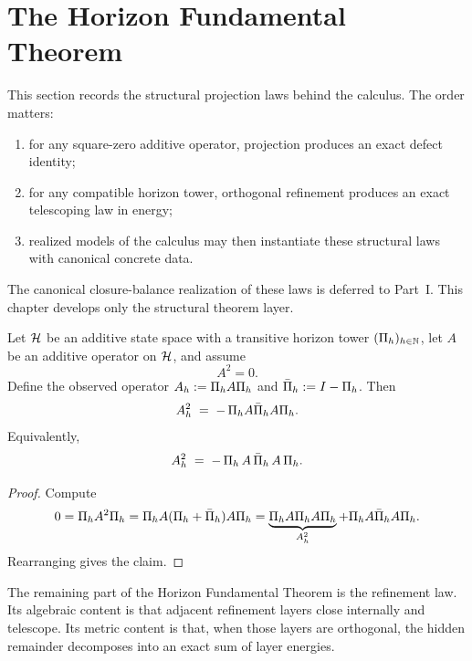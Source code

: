 \section{The Horizon Fundamental Theorem}
\label{sec:hft}

This section records the structural projection laws behind the calculus.
The order matters:

\begin{enumerate}[label=(\roman*)]
\item for any square-zero additive operator, projection produces an exact defect identity;
\item for any compatible horizon tower, orthogonal refinement produces an exact telescoping law in energy;
\item realized models of the calculus may then instantiate these structural laws with canonical concrete data.
\end{enumerate}

The canonical closure-balance realization of these laws is deferred to
Part~I. This chapter develops only the structural theorem layer.

\begin{theorem}
\label{thm:HFT1-general}
Let $\mathcal{H}$ be an additive state space with a transitive horizon tower $(\Pi_{h})_{h\in\mathbb{N}}$, let $A$ be an additive operator on $\mathcal{H}$, and assume
\[
A^2 = 0.
\]
Define the observed operator $A_{h} := \Pi_{h} A \Pi_{h}$ and $\bar{\Pi}_{h} := I - \Pi_{h}$.
Then
\[
A_{h}^2 \;=\; -\,\Pi_{h} A \bar{\Pi}_{h} A \Pi_{h}.
\]
Equivalently,
\[
A_{h}^2 \;=\; -\,\Pi_{h}\, A \,\bar{\Pi}_{h}\, A \,\Pi_{h}.
\]
\end{theorem}

\begin{proof}
Compute
\[
0 = \Pi_{h} A^2 \Pi_{h}
= \Pi_{h} A(\Pi_{h} + \bar{\Pi}_{h})A\Pi_{h}
= \underbrace{\Pi_{h} A\Pi_{h} A\Pi_{h}}_{A_{h}^2} + \Pi_{h} A \bar{\Pi}_{h} A \Pi_{h}.
\]
Rearranging gives the claim.
\end{proof}

The remaining part of the Horizon Fundamental Theorem is the refinement law.
Its algebraic content is that adjacent refinement layers close internally and telescope.
Its metric content is that, when those layers are orthogonal, the hidden remainder decomposes into an exact sum of layer energies.

